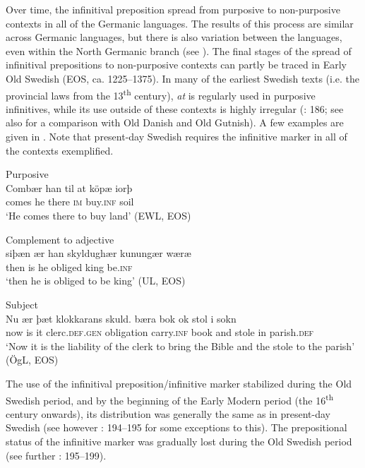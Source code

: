 \documentclass[output=paper]{langscibook}
\begin{document}
Over time, the infinitival preposition spread from purposive to non-purposive contexts in all of the Germanic languages. The results of this process are similar across Germanic languages, but there is also variation between the languages, even within the North Germanic branch (see \citealt{Haspelmath1989,Los2005,Kalm2016Prepositioner, Kalm2016Satsekvivalenta,Kalm2019}). The final stages of the spread of infinitival prepositions to non-purposive contexts can partly be traced in Early Old Swedish (EOS, ca. 1225–1375). In many of the earliest Swedish texts (i.e. the provincial laws from the 13\textsuperscript{th} century), \textit{at} is regularly used in purposive infinitives, while its use outside of these contexts is highly irregular (\citealt{Kalm2016Satsekvivalenta}: 186; see also \citealt{Kalm2019} for a comparison with Old Danish and Old Gutnish). A few examples are given in . Note that present-day Swedish requires the infinitive marker in all of the contexts exemplified.\pagebreak


\ea
\label{ex:kalm:4}
\ea Purposive\\\label{ex:kalm:4a}
\gll Combær han til at köpæ iorþ\\ 
comes he there \textsc{im} buy.\textsc{inf} soil\\
\glt‘He comes there to buy land’ (EWL, EOS) 

\ex Complement to adjective\\\label{ex:kalm:4b}
\gll siþæn ær han skyldughær kunungær wæræ\\
 then is he obliged king be.\textsc{inf}\\
\glt ‘then he is obliged to be king’ (UL, EOS)
 
\ex Subject\\\label{ex:kalm:4c}
\gll Nu ær þæt klokkarans skuld. bæra bok ok stol i sokn\\
now is it clerc.\textsc{def.gen} obligation carry.\textsc{inf} book and stole in parish.\textsc{def}\\
\glt ‘Now it is the liability of the clerk to bring the Bible and the stole to the parish’ (ÖgL, EOS)
\z 
\z 



The use of the infinitival preposition/infinitive marker stabilized during the Old Swedish period, and by the beginning of the Early Modern period (the 16\textsuperscript{th} century onwards), its distribution was generally the same as in present-day Swedish (see however \citealt{Hellquist1902}: 194–195 for some exceptions to this). The prepositional status of the infinitive marker was gradually lost during the Old Swedish period (see further \citealt{Kalm2016Satsekvivalenta}: 195–199). 
\end{document}
